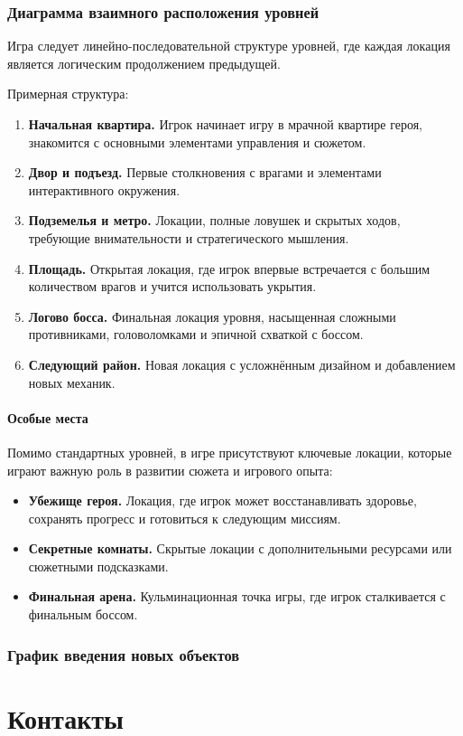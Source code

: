 \documentclass[12pt]{article}
\begin{document}
        \subsubsection{Диаграмма взаимного расположения уровней}
        Игра следует линейно-последовательной структуре уровней, где каждая локация является логическим продолжением предыдущей.  
        
        Примерная структура:  
        \begin{enumerate}
            \item \textbf{Начальная квартира.} Игрок начинает игру в мрачной квартире героя, знакомится с основными элементами управления и сюжетом.  
            \item \textbf{Двор и подъезд.} Первые столкновения с врагами и элементами интерактивного окружения.  
            \item \textbf{Подземелья и метро.} Локации, полные ловушек и скрытых ходов, требующие внимательности и стратегического мышления.  
            \item \textbf{Площадь.} Открытая локация, где игрок впервые встречается с большим количеством врагов и учится использовать укрытия.  
            \item \textbf{Логово босса.} Финальная локация уровня, насыщенная сложными противниками, головоломками и эпичной схваткой с боссом.  
            \item \textbf{Следующий район.} Новая локация с усложнённым дизайном и добавлением новых механик.  
        \end{enumerate}
        
        \paragraph{Особые места}  
        Помимо стандартных уровней, в игре присутствуют ключевые локации, которые играют важную роль в развитии сюжета и игрового опыта:  
        \begin{itemize}
            \item \textbf{Убежище героя.} Локация, где игрок может восстанавливать здоровье, сохранять прогресс и готовиться к следующим миссиям.  
            \item \textbf{Секретные комнаты.} Скрытые локации с дополнительными ресурсами или сюжетными подсказками.  
            \item \textbf{Финальная арена.} Кульминационная точка игры, где игрок сталкивается с финальным боссом.  
        \end{itemize}
        
        \subsubsection{График введения новых объектов}
    
\section{Контакты}

\newpage
\end{document}
